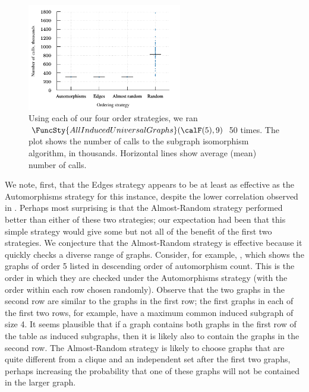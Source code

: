 \begin{figure}[htb]
    \centering

    \includegraphics*[width=0.601\textwidth]{15-universal-graphs/img/second-experiment-plot}

    \caption{Using each of our four order strategies, we ran
        $\FuncSty{AllInducedUniversalGraphs}(\calF(5),9)$ 50 times. The plot
        shows the number of calls to the subgraph isomorphism algorithm, in thousands.
        Horizontal lines show average (mean) number of calls.}
\label{fig:second-experiment}
\end{figure}

We note, first, that the Edges strategy appears to be at least as effective
as the Automorphisms strategy for this instance, despite the lower
correlation observed in .  Perhaps most surprising is
that the Almost-Random strategy performed better than either of these two
strategies; our expectation had been that this simple strategy would
give some but not all of the benefit of the first two strategies.
We conjecture that the Almost-Random strategy is effective because it
quickly checks a diverse range of graphs.  Consider, for example,
, which shows the graphs of order 5 listed
in descending order of automorphism count.  This is the order in which they
are checked under the Automorphisms strategy (with the order within each
row chosen randomly).  Observe that the two graphs in the second row are
similar to the graphs in the first row; the first graphs in each of the first
two rows, for example, have a maximum common induced subgraph of size 4.
It seems plausible that if a graph contains both graphs in the first row of
the table as induced subgraphs, then it is likely also to contain the graphs in the
second row. The Almost-Random strategy is likely to choose graphs
that are quite different from a clique and an independent set after the first
two graphs, perhaps increasing the probability that one of these graphs
will not be contained in the larger graph.

